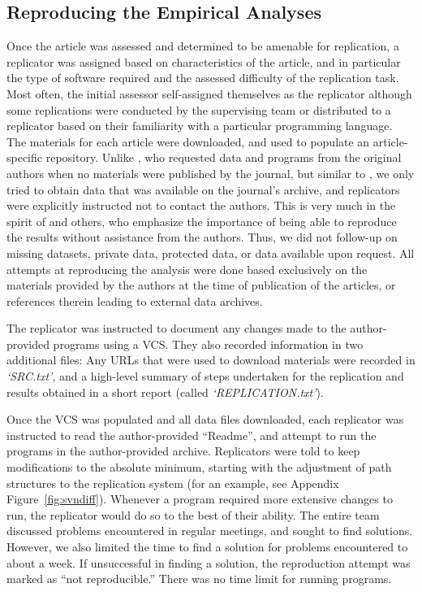 \FloatBarrier



\subsection{Reproducing the Empirical Analyses}

Once the article was assessed and determined to be amenable for replication, a replicator was assigned based on characteristics of the article, and in particular the type of software required and the assessed difficulty of the replication task. Most often, the initial assessor self-assigned themselves as the replicator although some replications were conducted by the supervising team or distributed to a replicator based on their familiarity with a particular programming language.
The materials for each article were downloaded, and used to populate an article-specific repository. 
%
%
Unlike  \textcite{Dewald1986,McCullough03,Stodden2018}, who requested data and programs from the original authors when no materials were published by the journal, but similar to \textcite{Glandon2010}, we only tried to obtain data that was available on the journal's archive, and replicators were explicitly instructed not to contact the authors. This is very much in the spirit of \textcite{King95,McCullough2006,Glandon2010} and others, who emphasize the importance of being able to reproduce the results without assistance from the authors. Thus, we did not follow-up on  missing datasets, private data, protected data, or data available upon request. All attempts at reproducing the analysis were done based exclusively on the materials provided by the authors at the time of publication of the articles, or references therein leading to external data archives.
%

The replicator was instructed to document any changes made to the author-provided programs using a \ac{VCS}. They also recorded information in two additional files: Any URLs that were used to download materials were recorded in \textit{`SRC.txt'}, and a high-level summary of steps undertaken for the replication and results obtained in a short report (called \textit{`REPLICATION.txt'}).

Once the \ac{VCS}  was populated and all data files  downloaded, each replicator was instructed to  read the author-provided ``Readme'', and attempt to run the programs in the author-provided archive. Replicators were told to keep modifications to the absolute minimum, starting with the adjustment of path structures to the replication system (for an example, see Appendix Figure~\ref{fig:svndiff}). Whenever a program required more extensive changes to run, the replicator would do so to the best of their ability. 
The entire team discussed problems encountered in regular meetings, and sought to find solutions. However, we also limited the time to find a solution for problems encountered to about a week. If unsuccessful in finding a solution, the reproduction attempt was marked as ``not reproducible.'' There was no time limit for running programs.

